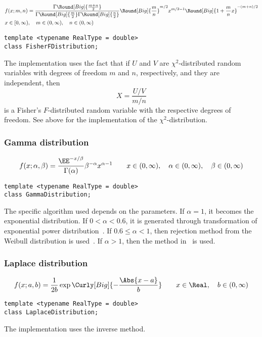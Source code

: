 \begin{align*}
  & f(x;m,n) =
  \frac{\Gamma\Round[Big]{\frac{m + n}{2}}}{
    \Gamma\Round[Big]{\frac{m}{2}}\Gamma\Round[Big]{\frac{n}{2}}}
  \Round[Big]{\frac{m}{n}}^{m/2} x^{m / 2 - 1}
  \Round[Big]{1 + \frac{m}{n}x}^{-(m + n) / 2} \\
  & x \in [0, \infty),\quad m \in (0, \infty),\quad n \in (0, \infty)
\end{align*}
\begin{Verbatim}
template <typename RealType = double>
class FisherFDistribution;
\end{Verbatim}
The implementation uses the fact that if $U$ and $V$ are $\chi^2$-distributed
random variables with degrees of freedom $m$ and $n$, respectively, and they
are independent, then
\begin{equation*}
  X = \frac{U / V}{m / n}
\end{equation*}
is a Fisher's $F$-distributed random variable with the respective degrees of
freedom. See above for the implementation of the $\chi^2$-distribution.

\subsubsection{Gamma distribution}

\begin{equation*}
  f(x;\alpha,\beta) =
  \frac{\EE^{-x/\beta}}{\Gamma(\alpha)}\beta^{-\alpha}x^{\alpha-1} \qquad
  x \in (0, \infty),\quad \alpha \in (0, \infty),\quad \beta \in (0, \infty)
\end{equation*}
\begin{Verbatim}
template <typename RealType = double>
class GammaDistribution;
\end{Verbatim}
The specific algorithm used depends on the parameters. If $\alpha = 1$, it
becomes the exponential distribution. If $0 < \alpha < 0.6$, it is generated
through transformation of exponential power
distribution~\cite[sec~2.6]{Devroye:1986gi}. If $0.6\le\alpha<1$, then
rejection method from the Weibull distribution is
used~\cite[sec.~3.4]{Devroye:1986gi}. If $\alpha > 1$, then the method
in~\cite{Marsaglia:2000vq} is used.

\subsubsection{Laplace distribution}

\begin{equation*}
  f(x;a,b) = \frac{1}{2b}\exp\Curly[Big]{-\frac{\Abs{x - a}}{b}} \qquad
  x \in \Real,\quad b \in (0, \infty)
\end{equation*}
\begin{Verbatim}
template <typename RealType = double>
class LaplaceDistribution;
\end{Verbatim}
The implementation uses the inverse method.

